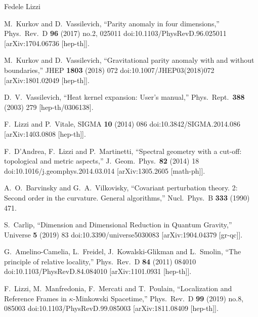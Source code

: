 \begin{artengenv}{Fedele Lizzi}
\begin{thebibliography}{99}
M.~Kurkov and D.~Vassilevich,
  ``Parity anomaly in four dimensions,''
  Phys.\ Rev.\ D {\bf 96} (2017) no.2,  025011
  doi:10.1103/PhysRevD.96.025011
  [arXiv:1704.06736 [hep-th]].
  
  M.~Kurkov and D.~Vassilevich,
  ``Gravitational parity anomaly with and without boundaries,''
  JHEP {\bf 1803} (2018) 072
  doi:10.1007/JHEP03(2018)072
  [arXiv:1801.02049 [hep-th]].

D.~V.~Vassilevich,
  ``Heat kernel expansion: User's manual,''
  Phys.\ Rept.\  {\bf 388} (2003) 279
  [hep-th/0306138].

F.~Lizzi and P.~Vitale,
  SIGMA {\bf 10} (2014) 086
  doi:10.3842/SIGMA.2014.086
  [arXiv:1403.0808 [hep-th]].

  F.~D'Andrea, F.~Lizzi and P.~Martinetti,
  ``Spectral geometry with a cut-off: topological and metric aspects,''
  J.\ Geom.\ Phys.\  {\bf 82} (2014) 18
  doi:10.1016/j.geomphys.2014.03.014
  [arXiv:1305.2605 [math-ph]].


  A.~O.~Barvinsky and G.~A.~Vilkovisky,
  ``Covariant perturbation theory. 2: Second order in the curvature. General algorithms,''
  Nucl.\ Phys.\ B {\bf 333} (1990) 471.
  
S.~Carlip,
  ``Dimension and Dimensional Reduction in Quantum Gravity,''
  Universe {\bf 5} (2019) 83
  doi:10.3390/universe5030083
  [arXiv:1904.04379 [gr-qc]].

G.~Amelino-Camelia, L.~Freidel, J.~Kowalski-Glikman and L.~Smolin,
  ``The principle of relative locality,''
  Phys.\ Rev.\ D {\bf 84} (2011) 084010
  doi:10.1103/PhysRevD.84.084010
  [arXiv:1101.0931 [hep-th]].


F.~Lizzi, M.~Manfredonia, F.~Mercati and T.~Poulain,
  ``Localization and Reference Frames in $\kappa$-Minkowski Spacetime,''
  Phys.\ Rev.\ D {\bf 99} (2019) no.8,  085003
  doi:10.1103/PhysRevD.99.085003
  [arXiv:1811.08409 [hep-th]].

\end{thebibliography}


\end{artengenv}

  
